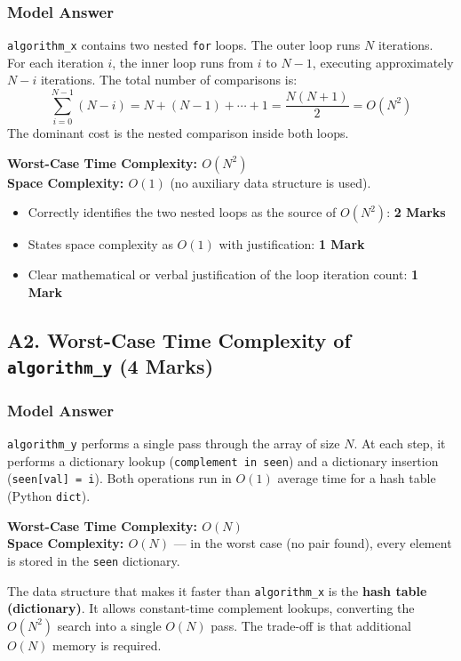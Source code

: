 \documentclass[11pt,a4paper]{article}
\newenvironment{markbox}[1]{%
    \begin{tcolorbox}[colback=markgreen!6!white, colframe=markgreen, title=\textbf{Mark Allocation --- #1}]
}{%
    \end{tcolorbox}
}
\begin{document}
\subsubsection*{Model Answer}
\texttt{algorithm\_x} contains two nested \texttt{for} loops. The outer loop runs $N$ iterations. For each iteration $i$, the inner loop runs from $i$ to $N-1$, executing approximately $N - i$ iterations. The total number of comparisons is:
\[
\sum_{i=0}^{N-1}(N - i) = N + (N-1) + \cdots + 1 = \frac{N(N+1)}{2} = O(N^2)
\]
The dominant cost is the nested comparison inside both loops.

\textbf{Worst-Case Time Complexity: $O(N^2)$} \\
\textbf{Space Complexity: $O(1)$} (no auxiliary data structure is used).

\begin{markbox}{A1 --- 4 Marks}
\begin{itemize}
    \item Correctly identifies the two nested loops as the source of $O(N^2)$: \textbf{2 Marks}
    \item States space complexity as $O(1)$ with justification: \textbf{1 Mark}
    \item Clear mathematical or verbal justification of the loop iteration count: \textbf{1 Mark}
\end{itemize}
\end{markbox}

\subsection*{A2. Worst-Case Time Complexity of \texttt{algorithm\_y} (4 Marks)}

\subsubsection*{Model Answer}
\texttt{algorithm\_y} performs a single pass through the array of size $N$. At each step, it performs a dictionary lookup (\texttt{complement in seen}) and a dictionary insertion (\texttt{seen[val] = i}). Both operations run in $O(1)$ average time for a hash table (Python \texttt{dict}).

\textbf{Worst-Case Time Complexity: $O(N)$} \\
\textbf{Space Complexity: $O(N)$} --- in the worst case (no pair found), every element is stored in the \texttt{seen} dictionary.

The data structure that makes it faster than \texttt{algorithm\_x} is the \textbf{hash table (dictionary)}. It allows constant-time complement lookups, converting the $O(N^2)$ search into a single $O(N)$ pass. The trade-off is that additional $O(N)$ memory is required.
\end{document}
